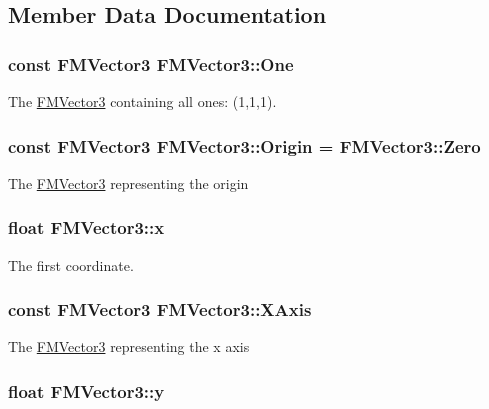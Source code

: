 \subsection{Member Data Documentation}
\hypertarget{classFMVector3_a7f981857b8d0f3f6839c0a9ff0c3e430}{
\subsubsection[{One}]{\setlength{\rightskip}{0pt plus 5cm}const {\bf FMVector3} {\bf FMVector3::One}}}
\label{classFMVector3_a7f981857b8d0f3f6839c0a9ff0c3e430}
The \hyperlink{classFMVector3}{FMVector3} containing all ones: (1,1,1). \hypertarget{classFMVector3_a886c355491c083e2664286caa7aa9ed8}{
\subsubsection[{Origin}]{\setlength{\rightskip}{0pt plus 5cm}const {\bf FMVector3} {\bf FMVector3::Origin} = {\bf FMVector3::Zero}}}
\label{classFMVector3_a886c355491c083e2664286caa7aa9ed8}
The \hyperlink{classFMVector3}{FMVector3} representing the origin \hypertarget{classFMVector3_ab31613614892bba88807d31b2c9ee87e}{
\subsubsection[{x}]{\setlength{\rightskip}{0pt plus 5cm}float {\bf FMVector3::x}}}
\label{classFMVector3_ab31613614892bba88807d31b2c9ee87e}
The first coordinate. \hypertarget{classFMVector3_a363010f82c60ec1d53a495de6284daf7}{
\subsubsection[{XAxis}]{\setlength{\rightskip}{0pt plus 5cm}const {\bf FMVector3} {\bf FMVector3::XAxis}}}
\label{classFMVector3_a363010f82c60ec1d53a495de6284daf7}
The \hyperlink{classFMVector3}{FMVector3} representing the x axis \hypertarget{classFMVector3_a6e8a45596a095d86205557d7231ef973}{
\subsubsection[{y}]{\setlength{\rightskip}{0pt plus 5cm}float {\bf FMVector3::y}}}
